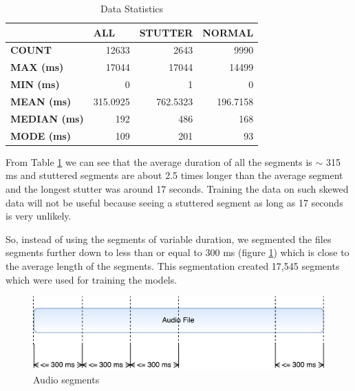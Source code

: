\documentclass{report}
\begin{document}
\begin{table}[ht]
\centering
\caption{Data Statistics}
\label{table:data-statistics}
\begin{tabular}{|l|r|r|r|}
\hline
                     & \multicolumn{1}{l|}{\textbf{ALL}} & \multicolumn{1}{l|}{\textbf{STUTTER}} & \multicolumn{1}{l|}{\textbf{NORMAL}} \\ \hline
\textbf{COUNT}       & 12633                             & 2643                                  & 9990                                 \\ \hline
\textbf{MAX (ms)}    & 17044                             & 17044                                 & 14499                                \\ \hline
\textbf{MIN (ms)}    & 0                                 & 1                                     & 0                                    \\ \hline
\textbf{MEAN (ms)}   & 315.0925                          & 762.5323                              & 196.7158                             \\ \hline
\textbf{MEDIAN (ms)} & 192                               & 486                                   & 168                                  \\ \hline
\textbf{MODE (ms)}   & 109                               & 201                                   & 93                                   \\ \hline
\end{tabular}
\end{table}

From Table \ref{table:data-statistics} we can see that the average duration of all the segments is $\sim$ 315 ms and stuttered segments are about 2.5 times longer than the average segment and the longest stutter was around 17 seconds. Training the data on such skewed data will not be useful because seeing a stuttered segment as long as 17 seconds is very unlikely.

So, instead of using the segments of variable duration, we segmented the files segments further down to less than or equal to 300 ms (figure \ref{fig:audioSegments}) which is close to the average length of the segments. This segmentation created 17,545 segments which were used for training the models.

\begin{figure}[ht]
    \centering
    \includegraphics[scale=0.7]{AudioSplits300ms.pdf}
    \caption{Audio segments}
    \label{fig:audioSegments}
\end{figure}
\end{document}

